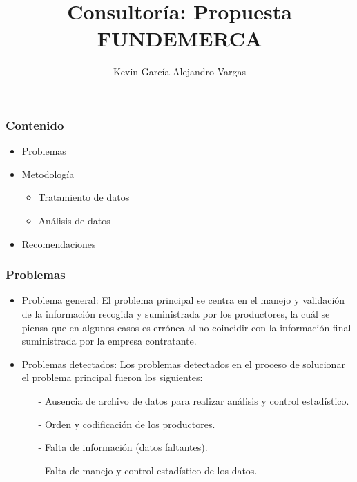 \documentclass[11pt]{beamer}
\author[Kevin García - Alejandro Vargas]{Kevin García \newline Alejandro Vargas }
\title[Consultoría]{Consultoría: Propuesta FUNDEMERCA}
\begin{document}
\justifying


\begin{frame}
\titlepage
\end{frame}


\begin{frame}
\frametitle{Contenido}
\begin{itemize}
\item Problemas
\item Metodología
\begin{itemize}
\item Tratamiento de datos
\item Análisis de datos
\end{itemize}
\item Recomendaciones
\end{itemize}
\end{frame}

\begin{frame}
\frametitle{Problemas}
\begin{itemize}
\justifying
\item Problema general: El problema principal se centra en el manejo y validación de la información recogida y suministrada por los productores, la cuál se piensa que en algunos casos es errónea al no coincidir con la información final suministrada por la empresa contratante.
\item Problemas detectados: Los problemas detectados en el proceso de solucionar el problema principal fueron los siguientes:
\begin{itemize}
\item[-]Ausencia de archivo de datos para realizar análisis y control estadístico.
\item[-]Orden y codificación de los productores.
\item[-]Falta de información (datos faltantes).
\item[-]Falta de manejo y control estadístico de los datos.
\end{itemize}
\end{itemize}
\end{frame}
\end{document}
